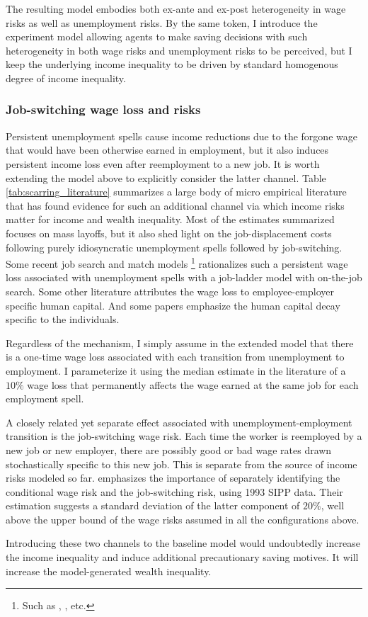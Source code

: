 The resulting model embodies both ex-ante and ex-post heterogeneity in wage risks as well as unemployment risks. By the same token, I introduce the experiment model allowing agents to make saving decisions with such heterogeneity in both wage risks and unemployment risks to be perceived, but I keep the underlying income inequality to be driven by standard homogenous degree of income inequality. 

\subsubsection{Job-switching wage loss and risks}

Persistent unemployment spells cause income reductions due to the forgone wage that would have been otherwise earned in employment, but it also induces persistent income loss even after reemployment to a new job. It is worth extending the model above to explicitly consider the latter channel. Table \ref{tab:scarring_literature} summarizes a large body of micro empirical literature that has found evidence for such an additional channel via which income risks matter for income and wealth inequality. Most of the estimates summarized focuses on mass layoffs, but it also shed light on the job-displacement costs following purely idiosyncratic unemployment spells followed by job-switching. Some recent job search and match models \footnote{Such as \cite{low2010wage}, \cite{lachowska2020sources}, etc.} rationalizes such a persistent wage loss associated with unemployment spells with a job-ladder model with on-the-job search. Some other literature attributes the wage loss to employee-employer specific human capital. And some papers emphasize the human capital decay specific to the individuals. 

Regardless of the mechanism, I simply assume in the extended model that there is a one-time wage loss associated with each transition from unemployment to employment. I parameterize it using the median estimate in the literature of a $10\%$ wage loss that permanently affects the wage earned at the same job for each employment spell. 

A closely related yet separate effect associated with  unemployment-employment transition is the job-switching wage risk. Each time the worker is reemployed by a new job or new employer, there are possibly good or bad wage rates drawn stochastically specific to this new job. This is separate from the source of income risks modeled so far.  \cite{low2010wage} emphasizes the importance of separately identifying the conditional wage risk and the job-switching risk, using 1993 SIPP data. Their estimation suggests a standard deviation of the latter component of $20\%$, well above the upper bound of the wage risks assumed in all the configurations above. 

Introducing these two channels to the baseline model would undoubtedly increase the income inequality and induce additional precautionary saving motives. It will increase the model-generated wealth inequality.  